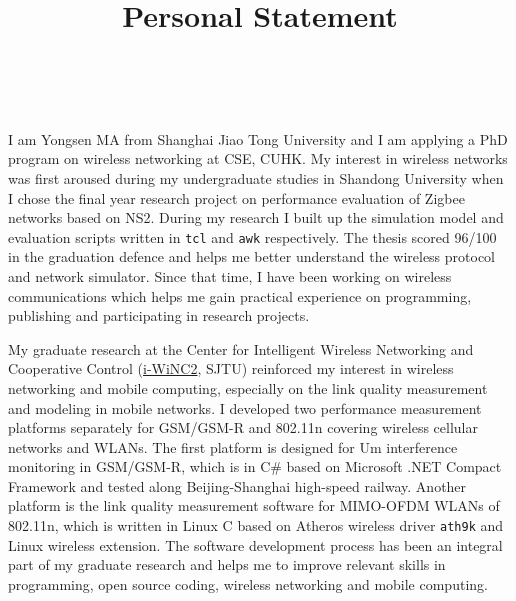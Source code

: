 \documentclass[journal,onecolumn]{IEEEtran}
\title{Personal Statement}
\author{\IEEEauthorblockN{Yongsen MA} \\
}
\begin{document}
\maketitle%

I am Yongsen MA from Shanghai Jiao Tong University and I am applying a PhD program on wireless networking at CSE, CUHK. My interest in wireless networks was first aroused during my undergraduate studies in Shandong University when I chose the final year research project on performance evaluation of Zigbee networks based on NS2. During my research I built up the simulation model and evaluation scripts written in \verb"tcl" and \verb"awk" respectively. The thesis scored 96/100 in the graduation defence and helps me better understand the wireless protocol and network simulator. Since that time, I have been working on wireless communications which helps me gain practical experience on programming, publishing and participating in research projects.

My graduate research at the Center for Intelligent Wireless Networking and Cooperative Control (\href{http://wicnc.sjtu.edu.cn}{i-WiNC2}, SJTU) reinforced my interest in wireless networking and mobile computing, especially on the link quality measurement and modeling in mobile networks. I developed two performance measurement platforms separately for GSM/GSM-R and 802.11n covering wireless cellular networks and WLANs. The first platform is designed for Um interference monitoring in GSM/GSM-R, which is in C\# based on Microsoft .NET Compact Framework and tested along Beijing-Shanghai high-speed railway. Another platform is the link quality measurement software for MIMO-OFDM WLANs of 802.11n, which is written in Linux C based on Atheros wireless driver \texttt{ath9k} and Linux wireless extension. The software development process has been an integral part of my graduate research and helps me to improve relevant skills in programming, open source coding, wireless networking and mobile computing.
\end{document}
